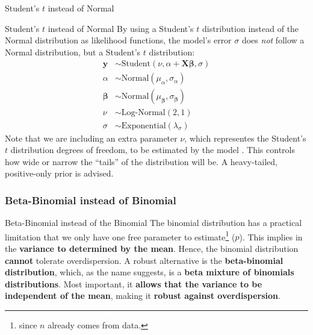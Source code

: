 \begin{frame}{Student's $t$ instead of Normal}
	\centering
\end{frame}

\begin{frame}{Student's $t$ instead of Normal}
	By using a Student's $t$ distribution instead of the Normal distribution
	as likelihood functions,
	the model's error $\sigma$ does \textit{not} follow a Normal distribution,
	but a Student's $t$ distribution:
	$$
		\begin{aligned}
			\mathbf{y}     & \sim \text{Student}\left( \nu, \alpha + \mathbf{X} \boldsymbol{\beta}, \sigma \right) \\
			\alpha             & \sim \text{Normal}(\mu_\alpha, \sigma_\alpha)                                         \\
			\boldsymbol{\beta} & \sim \text{Normal}(\mu_{\boldsymbol{\beta}}, \sigma_{\boldsymbol{\beta}})             \\
			\nu                & \sim \text{Log-Normal}(2, 1)                                                          \\
			\sigma             & \sim \text{Exponential}(\lambda_\sigma)
		\end{aligned}
	$$
	\small
	Note that we are including an extra parameter $\nu$,
	which representes the Student's $t$ distribution degrees of freedom,
	to be estimated by the model \parencite{gelman2013bayesian}.
	This controls how wide or narrow the ``tails'' of the distribution will be.
	A heavy-tailed, positive-only prior is advised.
\end{frame}

\subsubsection{Beta-Binomial instead of Binomial}
\begin{frame}{Beta-Binomial instead of the Binomial}
	The binomial distribution has a practical limitation that we only have
	one free parameter to estimate\footnote{since $n$ already comes from data.} ($p$).
	This implies in the \textbf{variance to determined by the mean}.
	Hence, the binomial distribution \textbf{cannot} tolerate overdispersion.
	\vfill
	A robust alternative is the \textbf{beta-binomial distribution}, which,
	as the name suggests, is a \textbf{beta mixture of binomials distributions}.
	Most important, it \textbf{allows that the variance to be independent of the mean},
	making it \textbf{robust against overdispersion}.
\end{frame}

